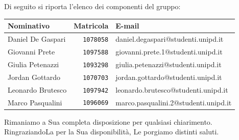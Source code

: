 \documentclass[a4paper,12pt]{letteracdp}
\begin{document}
\begin{letter}
    \noindent Di seguito si riporta l'elenco dei componenti del gruppo:
    \vspace{0.8cm}
	\begin{center}
		\begin{tabular}{lrl}
			\toprule
			\textbf{Nominativo} & \textbf{Matricola} & \textbf{E-mail} \\
			\midrule
			Daniel De Gaspari 	& \texttt{1078058}	& daniel.degaspari@studenti.unipd.it\\
			Giovanni Prete		& \texttt{1097588}	& giovanni.prete.1@studenti.unipd.it \\
			Giulia	Petenazzi	& \texttt{1093298}	& giulia.petenazzi@studenti.unipd.it \\
			Jordan Gottardo		& \texttt{1070703}	& jordan.gottardo@studenti.unipd.it \\
			Leonardo Brutesco	& \texttt{1097942}	& leonardo.brutesco@studenti.unipd.it\\
			Marco Pasqualini	& \texttt{1096069}	&  marco.pasqualini.2@studenti.unipd.it \\
		    \bottomrule
		\end{tabular}
	\end{center}
    \vspace{0.8cm}
	\noindent Rimaniamo a Sua completa disposizione per qualsiasi chiarimento.\\
	RingraziandoLa per la Sua disponibilità, Le porgiamo distinti saluti.
    \closing{\mbox{}}

	\end{letter}
\end{document}
